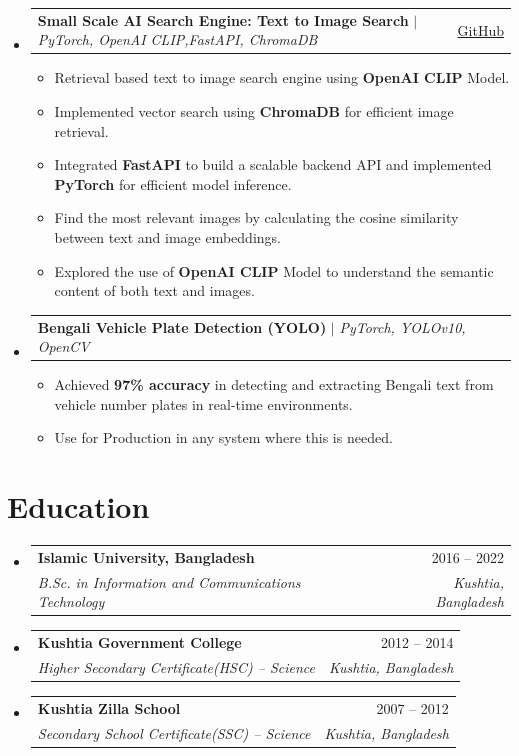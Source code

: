 \documentclass[10pt, a4paper]{article}
\makeatletter
\newcommand{\resumeItem}[1]{
  \item\small{
    {#1 \vspace{-2pt}}
  }
}
\newcommand{\resumeSubheading}[4]{
  \vspace{-2pt}\item
    \begin{tabular*}{\linewidth}[t]{@{}l@{\extracolsep{\fill}}r@{}}
      \textbf{#1} & \small#2 \\
      \textit{\small#3} & \textit{\footnotesize #4} \\
    \end{tabular*}\vspace{-7pt}
}
\newcommand{\resumeProjectHeading}[2]{
    \item
    \begin{tabular*}{\linewidth}{@{}l@{\extracolsep{\fill}}r@{}}
      \small#1 & \small#2 \\
    \end{tabular*}\vspace{-7pt}
}
\makeatother
\begin{document}
\begin{itemize}[leftmargin=0.02in, label={}]
      \resumeProjectHeading
        {\textbf{Small Scale AI Search Engine: Text to Image Search} $|$ \textit{PyTorch, OpenAI CLIP,FastAPI, ChromaDB}}{\href{https://github.com/mahfuz-raihan/text_to_image_search_demo.git}{GitHub}}
        \begin{itemize}
          \resumeItem{Retrieval based text to image search engine using \textbf{OpenAI CLIP} Model.}
          \resumeItem{Implemented vector search using \textbf{ChromaDB} for efficient image retrieval.}
          \resumeItem{Integrated \textbf{FastAPI} to build a scalable backend API and implemented \textbf{PyTorch} for efficient model inference.}
          \resumeItem{Find the most relevant images by calculating the cosine similarity between text and image embeddings.}
          \resumeItem{Explored the use of \textbf{OpenAI CLIP} Model to understand the semantic content of both text and images.}
        \end{itemize}

      \resumeProjectHeading
        {\textbf{Bengali Vehicle Plate Detection (YOLO)} $|$ \textit{PyTorch, YOLOv10, OpenCV}}{}
        \begin{itemize}
          \resumeItem{Achieved \textbf{97\% accuracy} in detecting and extracting Bengali text from vehicle number plates in real-time environments.}
          \resumeItem{Use for Production in any system where this is needed. }
        \end{itemize}

    \end{itemize}

\section{Education}
  \begin{itemize}[leftmargin=0.02in, label={}]
    \resumeSubheading
      {Islamic University, Bangladesh}{2016 -- 2022}
      {B.Sc. in Information and Communications Technology}{Kushtia, Bangladesh}
    \resumeSubheading
      {Kushtia Government College}{2012 -- 2014}
      {Higher Secondary Certificate(HSC) -- \textit{Science}}{Kushtia, Bangladesh}
    \resumeSubheading
      {Kushtia Zilla School}{2007 -- 2012}
      {Secondary School Certificate(SSC) -- \textit{Science}}{Kushtia, Bangladesh}
  \end{itemize}

\end{document}
